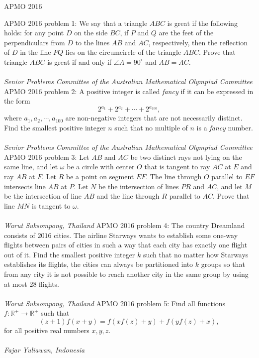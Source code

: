 APMO 2016 

APMO 2016 problem 1:  We say that a triangle $ABC$ is great if the following holds: for any point $D$ on the side $BC$, if $P$ and $Q$ are the feet of the perpendiculars from $D$ to the lines $AB$ and $AC$, respectively, then the reflection of $D$ in the line $PQ$ lies on the circumcircle of the triangle $ABC$. Prove that triangle $ABC$ is great if and only if $\angle A = 90^{\circ}$ and $AB = AC$. \\\\
\textit{Senior Problems Committee of the Australian Mathematical Olympiad Committee} 
APMO 2016 problem 2:  A positive integer is called \textit{fancy} if it can be expressed in the form
\[ 2^{a_1}+2^{a_2}+ \cdots+ 2^{a_{100}}, \]
where $a_1,a_2, \cdots, a_{100}$ are non-negative integers that are not necessarily distinct. Find the smallest positive integer $n$ such that no multiple of $n$ is a \textit{fancy} number. \\\\
\textit{Senior Problems Committee of the Australian Mathematical Olympiad Committee} 
APMO 2016 problem 3:  Let $AB$ and $AC$ be two distinct rays not lying on the same line, and let $\omega$ be a circle with center $O$ that is tangent to ray $AC$ at $E$ and ray $AB$ at $F$. Let $R$ be a point on segment $EF$. The line through $O$ parallel to $EF$ intersects line $AB$ at $P$. Let $N$ be the intersection of lines $PR$ and $AC$, and let $M$ be the intersection of line $AB$ and the line through $R$ parallel to $AC$. Prove that line $MN$ is tangent to $\omega$. \\\\
\textit{Warut Suksompong, Thailand} 
APMO 2016 problem 4:  The country Dreamland consists of $2016$ cities. The airline Starways wants to establish some one-way flights between pairs of cities in such a way that each city has exactly one flight out of it. Find the smallest positive integer $k$ such that no matter how Starways establishes its flights, the cities can always be partitioned into $k$ groups so that from any city it is not possible to reach another city in the same group by using at most $28$ flights. \\\\
\textit{Warut Suksompong, Thailand} 
APMO 2016 problem 5:  Find all functions $f: \mathbb{R}^+ \to \mathbb{R}^+$ such that
\[ (z + 1)f(x + y) = f(xf(z) + y) + f(yf(z) + x), \]
for all positive real numbers $x, y, z$. \\\\
\textit{Fajar Yuliawan, Indonesia} 

